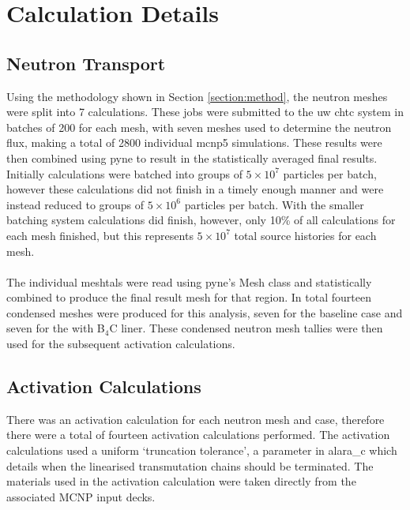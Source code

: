 \documentclass[12pt]{article}
\begin{document}
\newpage
\clearpage
\section{Calculation Details}
\subsection{Neutron Transport}
Using the methodology shown in Section \ref{section:method}, the neutron meshes
were split into 7 calculations. These jobs were submitted to the \gls{uw}
\gls{chtc} system in batches of 200 for each mesh, with seven meshes used to
determine the neutron flux, making a
total of 2800 individual \gls{mcnp5} simulations. These results were then
combined using \gls{pyne} to result in the statistically averaged final results.
Initially calculations were batched into groups of $5\times10^7$ particles per
batch, however these calculations did not finish in a timely enough manner and
were instead reduced to groups of $5\times10^6$ particles per batch. With the
smaller batching system calculations did finish, however, only 10\% of all
calculations for each mesh finished, but this represents $5\times10^7$ total
source histories for each mesh.
\\
\\
The individual meshtals were read using \gls{pyne}'s Mesh class and statistically
combined to produce the final result mesh for that region. In total fourteen 
condensed meshes were produced for this analysis, seven for the baseline case
and seven for the with B$_4$C liner. These condensed neutron mesh tallies were
then used for the subsequent activation calculations.

\subsection{Activation Calculations}
There was an activation calculation for each neutron mesh and case, therefore
there were a total of fourteen activation calculations performed. The activation
calculations used a uniform `truncation tolerance', a parameter in \gls{alara_c}
which details when the linearised transmutation chains should be terminated. The
materials used in the activation calculation were taken directly from the 
associated MCNP input decks. 
\end{document}
